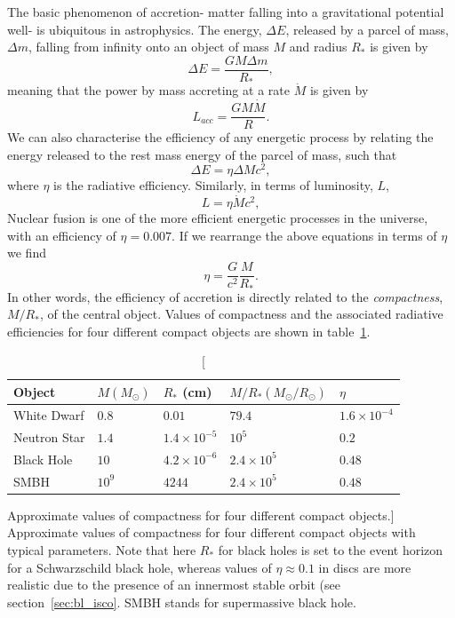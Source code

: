 The basic phenomenon of accretion- matter falling into a gravitational potential well- 
is ubiquitous in astrophysics. The energy, $\Delta E$, released by a parcel of 
mass, $\Delta m$, falling from infinity onto an object of mass $M$ and radius $R_*$
is given by
\begin{equation}
\Delta E = \frac{GM \Delta m}{R_*},
\label{eq:acc_energy}
\end{equation} 
meaning that the power by mass accreting at a rate $\dot{M}$ is given by
\begin{equation}
L_{acc} = \frac{GM \dot{M}}{R}.
\label{eq:acc_energy}
\end{equation} 
We can also characterise the efficiency of any energetic process by relating
the energy released to the rest mass energy of the parcel of mass, such that
\begin{equation}
\Delta E = \eta \Delta M c^2,
\label{eq:restmass}
\end{equation} 
where $\eta$ is the radiative efficiency. Similarly, in terms of luminosity, $L$,
\begin{equation}
L = \eta \dot{M} c^2,
\label{eq:restmass2}
\end{equation} 
Nuclear fusion is one of the more efficient
energetic processes in the universe, with an efficiency of
$\eta=0.007$. If we rearrange the above equations in terms of $\eta$ we find
\begin{equation}
\eta = \frac{G}{c^2} \frac{M}{R_*}.
\label{eq:eta}
\end{equation} 
In other words, the efficiency of accretion is directly related 
to the {\em compactness}, $M/R_*$, of the central object. 
Values of compactness and the associated radiative efficiencies 
for four different compact objects are shown in table~\ref{compact}. 

\begin{table}
\centering
\begin{tabular}{p{4cm}p{2cm}p{2cm}p{3cm}p{2cm}}
\hline 
Object & $M (M_\odot)$ & $R_*$ (cm) & $M/R_* (M_\odot / R_\odot)$ & $\eta$ \\ 
\hline \hline 
White Dwarf & $0.8$ & $0.01$ & $79.4$ & $1.6\times10^{-4}$ \\
Neutron Star & $1.4$ & $1.4\times10^{-5}$ & $10^5$ & $0.2$ \\
Black Hole & $10$ & $4.2\times10^{-6}$ & $2.4\times10^5$ & $0.48$ \\
SMBH & $10^9$ & $4244$ & $2.4\times10^5$ & $0.48$ \\
\end{tabular}
\centering
\caption
[Approximate values of compactness for four different compact objects.]
{
Approximate values of compactness for four different compact objects with typical
parameters. Note that here $R_*$ for black holes is set to the event horizon
for a Schwarzschild black hole, whereas values of $\eta \approx 0.1$ in discs 
are more realistic due to the presence of an innermost stable 
orbit (see section~\ref{sec:bl_isco}. 
SMBH stands for supermassive black hole.
}
\label{compact}
\end{table}

